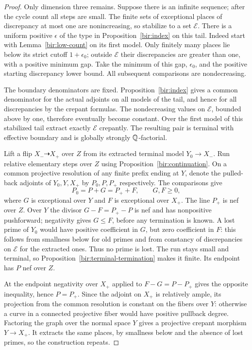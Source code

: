 \begin{proof}
Only dimension three remains.  Suppose there is an infinite
sequence; after the cycle count all steps are small.  The finite sets
of exceptional places of discrepancy at most one are nonincreasing,
so stabilize to a set $\mathcal E$.  There is a uniform positive
$\epsilon$ of the type in Proposition~\ref{bir:index} on this tail.
Indeed start with Lemma~\ref{bir:low-count} on its first model.  Only
finitely many places lie below its strict cutoff $1+\epsilon_0$;
outside $\mathcal E$ their discrepancies are greater than one, with
a positive minimum gap.  Take the minimum of this gap,
$\epsilon_0$, and the positive starting discrepancy lower bound.
All subsequent comparisons are nondecreasing.

The boundary denominators are fixed.  Proposition~\ref{bir:index}
gives a common denominator for the actual adjoints on all models of
the tail, and hence for all discrepancies by the crepant formulas.
The nondecreasing values on $\mathcal E$, bounded above by one,
therefore eventually become constant.  Over the first model of this
stabilized tail extract exactly $\mathcal E$ crepantly.  The
resulting pair is terminal with effective boundary and is globally
strongly $\mathbb{Q}$-factorial.

Lift a flip $X_-\dashrightarrow X_+$ over $Z$ from its extracted
terminal model $Y_0\to X_-$.  Run relative elementary steps over $Z$
using Proposition~\ref{bir:continuation}.  On a common projective
resolution of any finite prefix ending at $Y$, denote the pulled-back
adjoints of $Y_0,Y,X_+$ by $P_0,P,P_+$ respectively.  The comparisons
give
\begin{equation}
 P_0=P+G=P_++F,
 \qquad G,F\geq0,
 \label{bir:terminal-lift}
\end{equation}
where $G$ is exceptional over $Y$ and $F$ is exceptional over $X_+$.
The line $P_+$ is nef over $Z$.  Over $Y$ the divisor
$G-F=P_+-P$ is nef and has nonpositive pushforward; negativity gives
$G\leq F$, before any termination is known.  A lost prime of $Y_0$
would have positive coefficient in $G$, but zero coefficient in $F$:
this follows from smallness below for old primes and from constancy
of discrepancies on $\mathcal E$ for the extracted ones.  Thus no
prime is lost.  The run stays small and terminal, so
Proposition~\ref{bir:terminal-termination} makes it finite.  Its
endpoint has $P$ nef over $Z$.

At the endpoint negativity over $X_+$ applied to $F-G=P-P_+$ gives
the opposite inequality, hence $P=P_+$.  Since the adjoint on $X_+$
is relatively ample, its projection from the common resolution is
constant on the fibers over $Y$: otherwise a curve in a connected
projective fiber would have positive pullback degree.  Factoring the
graph over the normal space $Y$ gives a projective crepant morphism
$Y\to X_+$.  It extracts the same places, by smallness below and the
absence of lost primes, so the construction repeats.


\end{proof}
